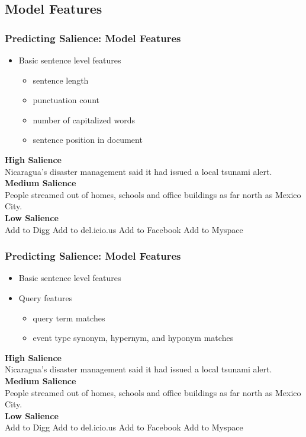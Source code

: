 \documentclass{beamer}
\begin{document}
\subsection{Model Features}
\begin{frame}
\frametitle{Predicting Salience: Model Features}
\begin{itemize}
\item Basic sentence level features
\begin{itemize}
\item sentence length
\item punctuation count
\item \alert<2-4>{number of capitalized words}
\item sentence position in document
\end{itemize}
\end{itemize}

\pause
\textbf{High Salience}\\ 
\alert<2>{Nicaragua's} disaster management said it had issued a local tsunami alert.\\
\textbf{Medium Salience} \\
\alert<3>{People} streamed out of homes, schools and office buildings as far north as \alert<3>{Mexico City.}\\

\textbf{Low Salience} \\
\alert<4>{Add} to \alert<4>{Digg Add} to del.icio.us \alert<4>{Add} to \alert<4>{Facebook Add} to \alert<4>{Myspace} 

\end{frame}

\begin{frame}
\frametitle{Predicting Salience: Model Features}
\begin{itemize}
\item Basic sentence level features
\item Query features
\begin{itemize}
\item query term matches
\item event type synonym, \alert<2>{hypernym}, and hyponym matches
\end{itemize}
\end{itemize}

\textbf{High Salience}\\ 
Nicaragua's \alert<2>{disaster} management said it had issued a local tsunami alert.\\
\textbf{Medium Salience} \\
People streamed out of homes, schools and office buildings as far north as 
Mexico City.\\

\textbf{Low Salience} \\
Add to Digg Add to del.icio.us Add to Facebook Add to Myspace

\end{frame}
\end{document}
